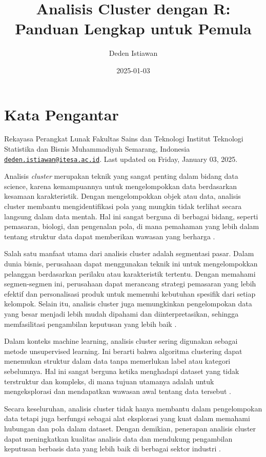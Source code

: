 \documentclass[
  oneside]{book}
\title{Analisis Cluster dengan R: Panduan Lengkap untuk Pemula}
\author{Deden Istiawan}
\date{2025-01-03}
\begin{document}
\maketitle

{
\setcounter{tocdepth}{1}
\tableofcontents
}
\chapter*{Kata Pengantar}\label{kata-pengantar}

Rekayasa Perangkat Lunak
Fakultas Sains dan Teknologi Institut Teknologi Statistika dan
Bisnis Muhammadiyah Semarang, Indonesia
\href{mailto:deden.istiawan@itesa.ac.id}{\nolinkurl{deden.istiawan@itesa.ac.id}}.
Last updated on Friday, January 03, 2025.

Analisis \emph{cluster} merupakan teknik yang sangat penting dalam bidang data
science, karena kemampuannya untuk mengelompokkan data berdasarkan
kesamaan karakteristik. Dengan mengelompokkan objek atau data, analisis
cluster membantu mengidentifikasi pola yang mungkin tidak terlihat
secara langsung dalam data mentah. Hal ini sangat berguna di berbagai
bidang, seperti pemasaran, biologi, dan pengenalan pola, di mana
pemahaman yang lebih dalam tentang struktur data dapat memberikan
wawasan yang berharga \citep{kaufman:clustering1990}.

Salah satu manfaat utama dari analisis cluster adalah segmentasi pasar.
Dalam dunia bisnis, perusahaan dapat menggunakan teknik ini untuk
mengelompokkan pelanggan berdasarkan perilaku atau karakteristik
tertentu. Dengan memahami segmen-segmen ini, perusahaan dapat merancang
strategi pemasaran yang lebih efektif dan personalisasi produk untuk
memenuhi kebutuhan spesifik dari setiap kelompok. Selain itu, analisis
cluster juga memungkinkan pengelompokan data yang besar menjadi lebih
mudah dipahami dan diinterpretasikan, sehingga memfasilitasi pengambilan
keputusan yang lebih baik \citep{han2012mining}.

Dalam konteks machine learning, analisis cluster sering digunakan
sebagai metode unsupervised learning. Ini berarti bahwa algoritma
clustering dapat menemukan struktur dalam data tanpa memerlukan label
atau kategori sebelumnya. Hal ini sangat berguna ketika menghadapi
dataset yang tidak terstruktur dan kompleks, di mana tujuan utamanya
adalah untuk mengeksplorasi dan mendapatkan wawasan awal tentang data
tersebut \citep{jain2010}.

Secara keseluruhan, analisis cluster tidak hanya membantu dalam
pengelompokan data tetapi juga berfungsi sebagai alat eksplorasi yang
kuat dalam memahami hubungan dan pola dalam dataset. Dengan demikian,
penerapan analisis cluster dapat meningkatkan kualitas analisis data dan
mendukung pengambilan keputusan berbasis data yang lebih baik di
berbagai sektor industri .
\end{document}
